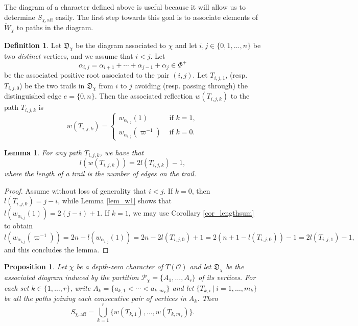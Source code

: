 \documentclass{article}
\newcommand{\aff}{\mathrm{aff}}
\newcommand{\cO}{\mathcal{O}}
\theoremstyle{plain}
\newtheorem{proposition}[theorem]{Proposition}
\newtheorem{lemma}[theorem]{Lemma}
\theoremstyle{definition}
\newtheorem{definition}[theorem]{Definition}
\begin{document}
    The diagram of a character defined above is useful because it will allow us to determine $S_{\chi,\aff}$ easily. The first step towards this goal is to associate elements of $\widetilde{W}_\chi$ to paths in the diagram.

    \begin{definition}
        Let $\mathfrak{D}_\chi$ be the diagram associated to $\chi$ and let $i,j\in\{0,1,\ldots,n\}$ be two \textit{distinct} vertices, and we assume that $i<j$. Let 
        $$\alpha_{i,j}=\alpha_{i+1}+\cdots+\alpha_{j-1}+\alpha_j\in\Phi^+$$
        be the associated positive root associated to the pair $(i,j)$. Let $T_{i,j,1}$, (resp. $T_{i,j,0}$) be the two trails in $\mathfrak{D}_\chi$ from $i$ to $j$ avoiding (resp. passing through) the distinguished edge $e=\{0,n\}$. Then the associated reflection $w(T_{i,j,k})$ to the path $T_{i,j,k}$ is
        \begin{equation*}
            w(T_{i,j,k})=
            \begin{cases}
                w_{\alpha_{i,j}}(1) &\text{ if } k=1,\\
                w_{\alpha_{i,j}}(\varpi^{-1}) &\text{ if } k=0.
            \end{cases}
        \end{equation*}
    \end{definition}

    \begin{lemma}
        For any path $T_{i,j,k}$, we have that 
        $$l(w(T_{i,j,k}))=2l(T_{i,j,k})-1,$$
        where the length of a trail is the number of edges on the trail.
    \end{lemma}
    \begin{proof}
        Assume without loss of generality that $i<j$. 
        If $k=0$, then $l(T_{i,j,0})=j-i$, while Lemma \ref{lem_w1} shows that $l(w_{\alpha_{i,j}}(1))=2(j-i)+1$. If $k=1$, we may use Corollary \ref{cor_lengthsum} to obtain
        $$l(w_{\alpha_{i,j}}(\varpi^{-1}))=2n-l(w_{\alpha_{i,j}}(1))=2n-2l(T_{i,j,0})+1=2(n+1-l(T_{i,j,0}))-1=2l(T_{i,j,1})-1,$$
        and this concludes the lemma.
    \end{proof}

    \begin{proposition}
        Let $\chi$ be a depth-zero character of $T(\cO)$ and let $\mathfrak{D}_\chi$ be the associated diagram induced by the partition $\mathcal{P}_\chi=\{A_1,\ldots,A_r\}$ of its vertices. For each set $k\in\{1,\ldots,r\}$, write $A_k=\{a_{k,1}<\cdots<a_{k,m_k}\}$ and let $\{T_{k,i}\ |\ i=1,\ldots,m_k\}$ be all the paths joining each consecutive pair of vertices in $A_k$. Then
        \begin{equation*}
            S_{\chi,\aff}=\bigcup_{k=1}^r \{w(T_{k,1}),\ldots,w(T_{k,m_k})\}.
        \end{equation*}
    \end{proposition}
\end{document}
